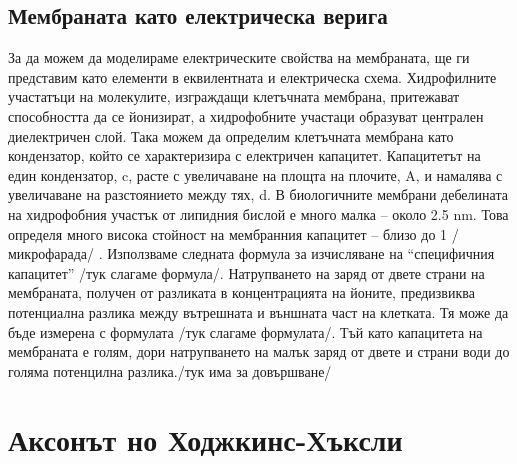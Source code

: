 \documentclass{article}
\begin{document}
\subsection{Мембраната като електрическа верига}

За да можем да моделираме електрическите свойства на мембраната, ще ги представим като елементи в еквилентната и електрическа схема. Хидрофилните участатъци на молекулите, изграждащи клетъчната мембрана, притежават способността да се йонизират, а хидрофобните участаци образуват централен диелектричен слой. Така можем да определим клетъчната мембрана като кондензатор, който се характеризира с електричен капацитет. Капацитетът на един кондензатор, c, расте с увеличаване на площта на плочите, A, и намалява с увеличаване на разстоянието между тях, d. В биологичните мембрани дебелината на хидрофобния участък от липидния бислой е много малка – около 2.5 nm. Това определя много висока стойност на мембранния капацитет – близо до 1 /микрофарада/ .  Използваме следната формула за изчисляване на “специфичния капацитет” /тук слагаме формула/. Натрупването на заряд от двете страни на мембраната, получен от разликата в концентрацията на йоните, предизвиква потенциална разлика между вътрешната и външната част на клетката. Тя може да бъде измерена с формулата /тук слагаме формулата/. Тъй като капацитета на мембраната е голям, дори натрупването на малък заряд от двете и страни води до голяма потенцилна разлика./тук има за довършване/ 

\section{Аксонът но Ходжкинс-Хъксли}
\end{document}
